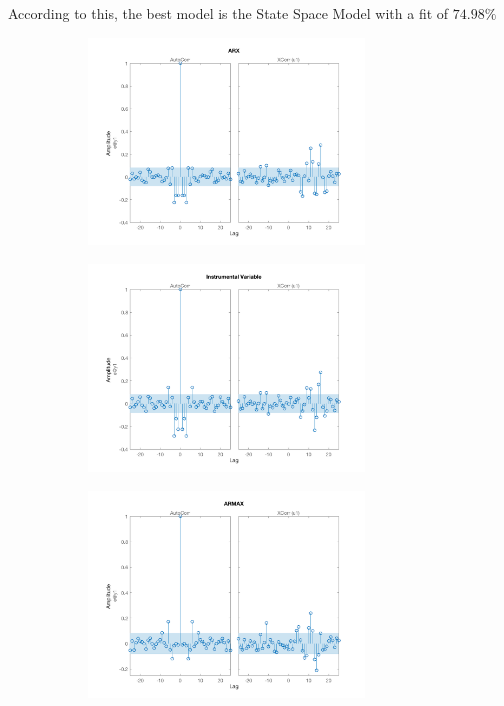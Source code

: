 According to this, the best model is the State Space Model with a fit of $74.98 \% $
\begin{figure}[h]
	\centering
	\begin{subfigure}{.49\textwidth}
		\includegraphics[height=5.5cm]{figures/v_arx.png}
		\label{fig:v_arx}
	\end{subfigure}\hfill
	\begin{subfigure}{.49\textwidth}
		\includegraphics[height=5.5cm]{figures/v_iv.png}
		\label{fig:v_iv4}
	\end{subfigure}
	\begin{subfigure}{.49\textwidth}
		\includegraphics[height=5.5cm]{figures/v_armax.png}
		\label{fig:v_armax}
	\end{subfigure}\hfill

\end{figure}
